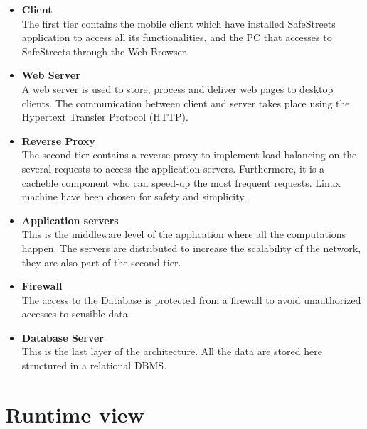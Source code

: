 \documentclass{report}
\begin{document}
\begin{itemize}
    \item \textbf{Client}\\
    The first tier contains the mobile client which have installed SafeStreets application
    to access all its functionalities, and the PC that accesses to SafeStreets through the Web Browser.\\
    \item \textbf{Web Server}\\
    A web server is used to store, process and deliver web pages to desktop
    clients. The communication between client and server takes place using the
    Hypertext Transfer Protocol (HTTP).
    \item \textbf{Reverse Proxy}\\
    The second tier contains a reverse proxy to implement load balancing on the several requests to access the application servers.
    Furthermore, it is a cacheble component who can speed-up the most frequent requests.
    Linux machine have been chosen for safety and simplicity. \\
    \item \textbf{Application servers}\\
    This is the middleware level of the application where all the computations happen. The servers
    are distributed to increase the scalability of the network, they are also part of the second tier.\\
    \item \textbf{Firewall}\\
    The access to the Database is protected from a firewall to avoid unauthorized accesses to sensible data.\\
    \item \textbf{Database Server}\\
    This is the last layer of the architecture. All the data are stored here structured in a relational DBMS.
\end{itemize}
\newpage
\section{Runtime view}
\end{document}
